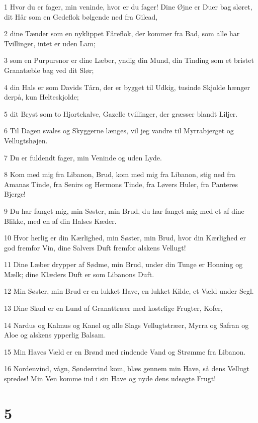 \par 1 Hvor du er fager, min veninde, hvor er du fager! Dine Øjne er Duer bag sløret, dit Hår som en Gedeflok bølgende ned fra Gilead,
\par 2 dine Tænder som en nyklippet Fåreflok, der kommer fra Bad, som alle har Tvillinger, intet er uden Lam;
\par 3 som en Purpursnor er dine Læber, yndig din Mund, din Tinding som et bristet Granatæble bag ved dit Slør;
\par 4 din Hals er som Davids Tårn, der er bygget til Udkig, tusinde Skjolde hænger derpå, kun Helteskjolde;
\par 5 dit Bryst som to Hjortekalve, Gazelle tvillinger, der græsser blandt Liljer.
\par 6 Til Dagen svales og Skyggerne længes, vil jeg vandre til Myrrabjerget og Vellugtshøjen.
\par 7 Du er fuldendt fager, min Veninde og uden Lyde.
\par 8 Kom med mig fra Libanon, Brud, kom med mig fra Libanon, stig ned fra Amanas Tinde, fra Senirs og Hermons Tinde, fra Løvers Huler, fra Panteres Bjerge!
\par 9 Du har fanget mig, min Søster, min Brud, du har fanget mig med et af dine Blikke, med en af din Halses Kæder.
\par 10 Hvor herlig er din Kærlighed, min Søster, min Brud, hvor din Kærlighed er god fremfor Vin, dine Salvers Duft fremfor alskens Vellugt!
\par 11 Dine Læber drypper af Sødme, min Brud, under din Tunge er Honning og Mælk; dine Klæders Duft er som Libanons Duft.
\par 12 Min Søster, min Brud er en lukket Have, en lukket Kilde, et Væld under Segl.
\par 13 Dine Skud er en Lund af Granattræer med kostelige Frugter, Kofer,
\par 14 Nardus og Kalmus og Kanel og alle Slags Vellugtstræer, Myrra og Safran og Aloe og alskens ypperlig Balsam.
\par 15 Min Haves Væld er en Brønd med rindende Vand og Strømme fra Libanon.
\par 16 Nordenvind, vågn, Søndenvind kom, blæs gennem min Have, så dens Vellugt spredes! Min Ven komme ind i sin Have og nyde dens udsøgte Frugt!

\chapter{5}

